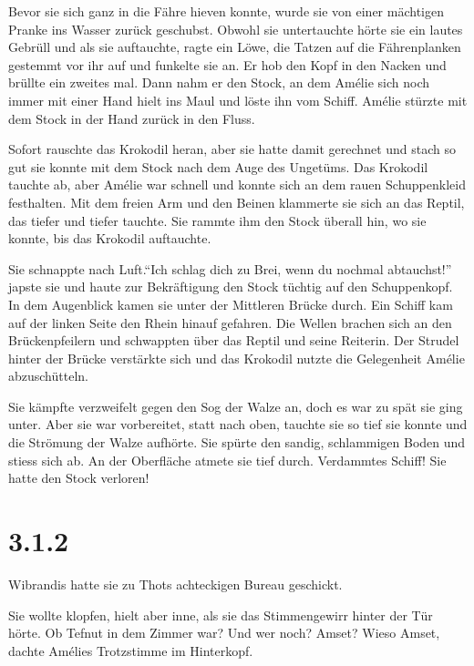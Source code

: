 \documentclass[11pt,titlepage,a5paper]{book}
\begin{document}
Bevor sie sich ganz in die Fähre hieven konnte, wurde sie von einer mächtigen Pranke ins Wasser zurück geschubst. Obwohl sie untertauchte hörte sie ein lautes Gebrüll und als sie auftauchte, ragte ein Löwe, die Tatzen auf die Fährenplanken gestemmt vor ihr auf und funkelte sie an. Er hob den Kopf in den Nacken und brüllte ein zweites mal. Dann nahm er den Stock, an dem Amélie sich noch immer mit einer Hand hielt ins Maul und löste ihn vom Schiff. Amélie stürzte mit dem Stock in der Hand zurück in den Fluss.

Sofort rauschte das Krokodil heran, aber sie hatte damit gerechnet und stach so gut sie konnte mit dem Stock nach dem Auge des Ungetüms. Das Krokodil tauchte ab, aber Amélie war schnell und konnte sich an dem rauen Schuppenkleid festhalten. Mit dem freien Arm und den Beinen klammerte sie sich an das Reptil, das tiefer und tiefer tauchte. Sie rammte ihm den Stock überall hin, wo sie konnte, bis das Krokodil auftauchte. 

Sie schnappte nach Luft."`Ich schlag dich zu Brei, wenn du nochmal abtauchst!"' japste sie und haute zur Bekräftigung den Stock tüchtig auf den Schuppenkopf. In dem Augenblick kamen sie unter der Mittleren Brücke durch. Ein Schiff kam auf der linken Seite den Rhein hinauf gefahren. Die Wellen brachen sich an den Brückenpfeilern und schwappten über das Reptil und seine Reiterin. Der Strudel hinter der Brücke verstärkte sich und das Krokodil nutzte die Gelegenheit Amélie abzuschütteln. 

Sie kämpfte verzweifelt gegen den Sog der Walze an, doch es war zu spät sie ging unter. Aber sie war vorbereitet, statt nach oben, tauchte sie so tief sie konnte und die Strömung der Walze aufhörte. Sie spürte den sandig, schlammigen Boden und stiess sich ab. An der Oberfläche atmete sie tief durch. Verdammtes Schiff! Sie hatte den Stock verloren! 

\section*{3.1.2}

Wibrandis hatte sie zu Thots achteckigen Bureau geschickt.

Sie wollte klopfen, hielt aber inne, als sie das Stimmengewirr hinter der Tür hörte. Ob Tefnut in dem Zimmer war? Und wer noch? Amset? Wieso Amset, dachte Amélies Trotzstimme im Hinterkopf.
\end{document}
